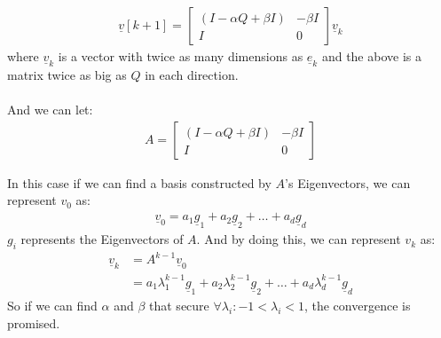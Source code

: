 \documentclass[11pt,letterpaper]{article}
\begin{document}
\begin{tcolorbox}
\begin{itemize}
        \begin{align*}
            \underline v[k+1]= \begin{bmatrix}
                (I - \alpha Q + \beta I) & - \beta I\\
                I & 0
            \end{bmatrix} \underline v_k
        \end{align*}
        where $\underline v_k$ is a vector with twice as many dimensions as $\underline e_k$ and the above is a matrix twice as big as $Q$ in each direction.
        \\\\
        And we can let:
        \begin{align*}
            A=
            \begin{bmatrix}
                (I - \alpha Q + \beta I) & - \beta I\\
                I & 0
            \end{bmatrix} 
        \end{align*}
        
        In this case if we can find a basis constructed by $A$'s Eigenvectors, we can represent $v_0$ as:
        \begin{align*}
            \underline v_0 = a_1\underline g_1 + a_2\underline g_2 + \dots + a_d\underline g_d
        \end{align*}
        $g_i$ represents the Eigenvectors of $A$. And by doing this, we can represent $v_k$ as:
        \begin{align*}
            \underline v_k &= A^{k-1} \underline v_0 \\
            &= a_1\lambda_1^{k-1}\underline g_1 + a_2\lambda_2^{k-1}\underline g_2 + \dots + a_d\lambda_d^{k-1}\underline g_d
        \end{align*}
        So if we can find $\alpha$ and $\beta$ that secure $\forall \lambda_i: -1<\lambda_i<1$, the convergence is promised.
        \end{itemize}
\end{tcolorbox}
\newpage
\end{document}
